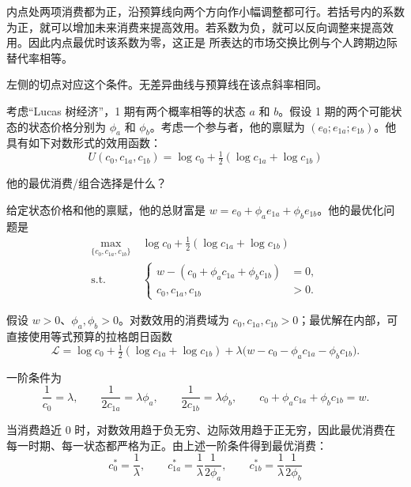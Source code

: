 内点处两项消费都为正，沿预算线向两个方向作小幅调整都可行。若括号内的系数为正，就可以增加未来消费来提高效用。若系数为负，就可以反向调整来提高效用。因此内点最优时该系数为零，这正是 所表达的市场交换比例与个人跨期边际替代率相等。

 左侧的切点对应这个条件。无差异曲线与预算线在该点斜率相同。

\begin{tcolorbox}[example]
\begin{question}
 考虑“Lucas 树经济”，1 期有两个概率相等的状态 $a$ 和 $b$。假设 1 期的两个可能状态的状态价格分别为 $\phi_{a}$ 和 $\phi_{b}$。考虑一个参与者，他的禀赋为 $(e_{0};e_{1a};e_{1b})$。他具有如下对数形式的效用函数：
\[
    U(c_{0},c_{1a},c_{1b})=\log c_{0}+\tfrac12(\log c_{1a}+\log c_{1b})
\]

他的最优消费/组合选择是什么？
\end{question}
\begin{solution}[blank-type=manual,blank-vsep=5\baselineskip]
给定状态价格和他的禀赋，他的总财富是 $w=e_{0}+\phi_{a}e_{1a}+\phi_{b}e_{1b}$。他的最优化问题是
\[
    \begin{aligned}
        \max_{\{c_{0},c_{1a},c_{1b}\}}\ &\log c_{0}+\tfrac12(\log c_{1a}+\log c_{1b})\\
        \text{s.t.}\quad &
        \left\{\begin{aligned}
        w-(c_{0}+\phi_{a}c_{1a}+\phi_{b}c_{1b})&=0,\\
        c_{0},c_{1a},c_{1b}&>0.
        \end{aligned}\right.
    \end{aligned}
\]

假设 $w>0$、$\phi_a,\phi_b>0$。对数效用的消费域为 $c_0,c_{1a},c_{1b}>0$；最优解在内部，可直接使用等式预算的拉格朗日函数
\[
    \mathcal{L}=\log c_{0}+\tfrac12(\log c_{1a}+\log c_{1b})+\lambda\bigl(w-c_0-\phi_a c_{1a}-\phi_b c_{1b}\bigr).
\]

一阶条件为
\[
  \frac1{c_0}=\lambda,\qquad
  \frac1{2c_{1a}}=\lambda\phi_a,\qquad
  \frac1{2c_{1b}}=\lambda\phi_b,\qquad
  c_0+\phi_a c_{1a}+\phi_b c_{1b}=w.
\]

当消费趋近 $0$ 时，对数效用趋于负无穷、边际效用趋于正无穷，因此最优消费在每一时期、每一状态都严格为正。由上述一阶条件得到最优消费：
\[
    c_{0}^{*}=\frac{1}{\lambda},\qquad
    c_{1a}^{*}=\frac{1}{\lambda}\frac{1}{2\phi_{a}},\qquad
    c_{1b}^{*}=\frac{1}{\lambda}\frac{1}{2\phi_{b}}
\]


\end{solution}
\end{tcolorbox}
